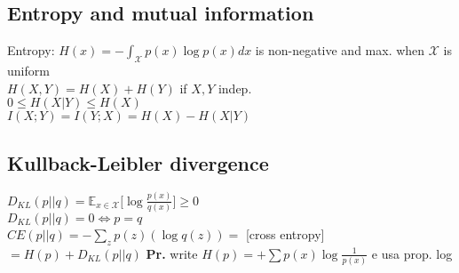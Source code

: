 \subsection*{Entropy and mutual information}
Entropy: $H(x)=-\int_{\mathcal{X}}p(x)\log p(x) dx$ is non-negative and max. when $\mathcal{X}$ is uniform \\
$H(X, Y)=H(X)+H(Y)$ if $X, Y$ indep. \\
$0 \leq H(X|Y) \leq H(X)$ \\
$I(X; Y) = I(Y; X) = H(X) - H(X|Y)$

\subsection*{Kullback-Leibler divergence}
$D_{KL}(p||q)=\mathbb{E}_{x\in\mathcal{X}}\big[\log\frac{p(x)}{q(x)}\big]\geq 0$ \\
$D_{KL}(p||q)=0\iff p=q$ \\
$CE(p||q) = -\sum_zp(z)(\log q(z))=$ [cross entropy] $= H(p) + D_{KL}(p||q)$ \textbf{Pr.} write $H(p) = +\sum p(x)\log\frac1{p(x)}$ e usa prop. log\\
